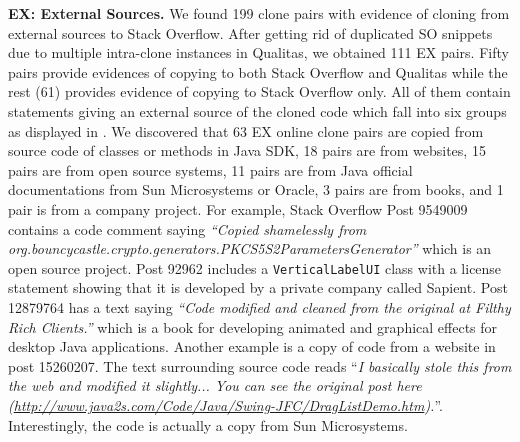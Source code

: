 \documentclass[10pt,journal,compsoc]{IEEEtran}
\begin{document}
\textbf{EX: External Sources.} We found 199 clone pairs with evidence of cloning
from external sources to Stack Overflow. After getting rid of duplicated SO
snippets due to multiple intra-clone instances in Qualitas, we obtained 111 EX
pairs. Fifty pairs provide evidences of copying to both Stack
Overflow and Qualitas while the rest (61) provides evidence of copying to
Stack Overflow only. All of them contain statements giving an external source of the
cloned code which fall into six groups as displayed in . 
We discovered that 63 EX online clone pairs are copied from source code of classes or 
methods in Java SDK, 18 pairs are from websites, 15 pairs are from open source systems,
11 pairs are from Java official documentations from Sun Microsystems or Oracle,
3 pairs are from books, and 1 pair is from a company project.
For example, Stack Overflow Post
9549009 contains a code comment saying \textit{``Copied shamelessly from
	org.bouncycastle.crypto.generators.PKCS5S2ParametersGenerator''} which is an
open source project. Post 92962 includes a {\small\texttt{VerticalLabelUI}}
class with a license statement showing that it is developed by a private company
called \textsf{Sapient}. Post 12879764 has a text saying \textit{``Code modified
	and cleaned from the original at Filthy Rich Clients.''} which is a book for
developing animated and graphical effects for desktop Java applications. Another
example is a copy of code from a website in post 15260207. The text surrounding
source code reads ``\textit{I basically stole this from the web and modified it
	slightly... You can see the original post here
	(\url{http://www.java2s.com/Code/Java/Swing-JFC/DragListDemo.htm}).}''.
Interestingly, the code is actually a copy from Sun Microsystems.
\end{document}
